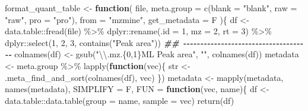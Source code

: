 \documentclass[
]{article}
\newenvironment{Shaded}{\begin{snugshade}}{\end{snugshade}}
\newcommand{\AttributeTok}[1]{\textcolor[rgb]{0.77,0.63,0.00}{#1}}
\newcommand{\ControlFlowTok}[1]{\textcolor[rgb]{0.13,0.29,0.53}{\textbf{#1}}}
\newcommand{\DecValTok}[1]{\textcolor[rgb]{0.00,0.00,0.81}{#1}}
\newcommand{\DocumentationTok}[1]{\textcolor[rgb]{0.56,0.35,0.01}{\textbf{\textit{#1}}}}
\newcommand{\FunctionTok}[1]{\textcolor[rgb]{0.00,0.00,0.00}{#1}}
\newcommand{\NormalTok}[1]{#1}
\newcommand{\OtherTok}[1]{\textcolor[rgb]{0.56,0.35,0.01}{#1}}
\newcommand{\SpecialCharTok}[1]{\textcolor[rgb]{0.00,0.00,0.00}{#1}}
\newcommand{\StringTok}[1]{\textcolor[rgb]{0.31,0.60,0.02}{#1}}
\begin{document}
\begin{Shaded}
\begin{Highlighting}[]
\NormalTok{format\_quant\_table }\OtherTok{\textless{}{-}} 
  \ControlFlowTok{function}\NormalTok{(}
\NormalTok{           file,}
           \AttributeTok{meta.group =} \FunctionTok{c}\NormalTok{(}\AttributeTok{blank =} \StringTok{"blank"}\NormalTok{, }\AttributeTok{raw =} \StringTok{"raw"}\NormalTok{, }\AttributeTok{pro =} \StringTok{"pro"}\NormalTok{),}
           \AttributeTok{from =} \StringTok{"mzmine"}\NormalTok{,}
           \AttributeTok{get\_metadata =}\NormalTok{ F}
\NormalTok{           )\{}
\NormalTok{    df }\OtherTok{\textless{}{-}}\NormalTok{ data.table}\SpecialCharTok{::}\FunctionTok{fread}\NormalTok{(file) }\SpecialCharTok{\%\textgreater{}\%} 
\NormalTok{      dplyr}\SpecialCharTok{::}\FunctionTok{rename}\NormalTok{(}\AttributeTok{.id =} \DecValTok{1}\NormalTok{, }\AttributeTok{mz =} \DecValTok{2}\NormalTok{, }\AttributeTok{rt =} \DecValTok{3}\NormalTok{) }\SpecialCharTok{\%\textgreater{}\%} 
\NormalTok{      dplyr}\SpecialCharTok{::}\FunctionTok{select}\NormalTok{(}\DecValTok{1}\NormalTok{, }\DecValTok{2}\NormalTok{, }\DecValTok{3}\NormalTok{, }\FunctionTok{contains}\NormalTok{(}\StringTok{"Peak area"}\NormalTok{))}
    \DocumentationTok{\#\# {-}{-}{-}{-}{-}{-}{-}{-}{-}{-}{-}{-}{-}{-}{-}{-}{-}{-}{-}{-}{-}{-}{-}{-}{-}{-}{-}{-}{-}{-}{-}{-}{-}{-}{-}{-}{-} }
    \FunctionTok{colnames}\NormalTok{(df) }\OtherTok{\textless{}{-}} \FunctionTok{gsub}\NormalTok{(}\StringTok{"}\SpecialCharTok{\textbackslash{}\textbackslash{}}\StringTok{.mz.\{0,1\}ML Peak area"}\NormalTok{, }\StringTok{""}\NormalTok{, }\FunctionTok{colnames}\NormalTok{(df))}
\NormalTok{    metadata }\OtherTok{\textless{}{-}}\NormalTok{ meta.group }\SpecialCharTok{\%\textgreater{}\%} 
      \FunctionTok{lapply}\NormalTok{(}\ControlFlowTok{function}\NormalTok{(vec)\{}
\NormalTok{               str }\OtherTok{\textless{}{-}} \FunctionTok{.meta\_find\_and\_sort}\NormalTok{(}\FunctionTok{colnames}\NormalTok{(df), vec)}
\NormalTok{           \})}
\NormalTok{    metadata }\OtherTok{\textless{}{-}} \FunctionTok{mapply}\NormalTok{(metadata, }\FunctionTok{names}\NormalTok{(metadata), }\AttributeTok{SIMPLIFY =}\NormalTok{ F,}
                       \AttributeTok{FUN =} \ControlFlowTok{function}\NormalTok{(vec, name)\{}
\NormalTok{                         df }\OtherTok{\textless{}{-}}\NormalTok{ data.table}\SpecialCharTok{::}\FunctionTok{data.table}\NormalTok{(}\AttributeTok{group =}\NormalTok{ name, }\AttributeTok{sample =}\NormalTok{ vec)}
                         \FunctionTok{return}\NormalTok{(df)}

\end{Highlighting}
\end{Shaded}
\end{document}
